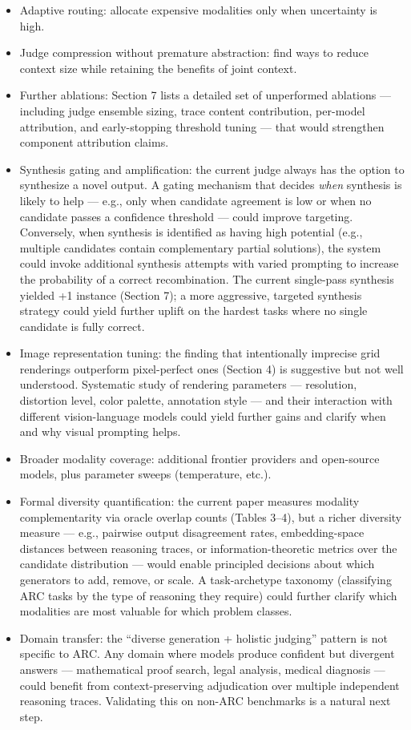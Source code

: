 \documentclass[11pt]{article}
\providecommand{\tightlist}{%
  \setlength{\itemsep}{0pt}\setlength{\parskip}{0pt}}
\begin{document}
\begin{itemize}
\tightlist
\item
  Adaptive routing: allocate expensive modalities only when uncertainty
  is high.
\item
  Judge compression without premature abstraction: find ways to reduce
  context size while retaining the benefits of joint context.
\item
  Further ablations: Section 7 lists a detailed set of unperformed
  ablations --- including judge ensemble sizing, trace content
  contribution, per-model attribution, and early-stopping threshold
  tuning --- that would strengthen component attribution claims.
\item
  Synthesis gating and amplification: the current judge always has the
  option to synthesize a novel output. A gating mechanism that decides
  \emph{when} synthesis is likely to help --- e.g., only when candidate
  agreement is low or when no candidate passes a confidence threshold
  --- could improve targeting. Conversely, when synthesis is identified
  as having high potential (e.g., multiple candidates contain
  complementary partial solutions), the system could invoke additional
  synthesis attempts with varied prompting to increase the probability
  of a correct recombination. The current single-pass synthesis yielded
  +1 instance (Section 7); a more aggressive, targeted synthesis
  strategy could yield further uplift on the hardest tasks where no
  single candidate is fully correct.
\item
  Image representation tuning: the finding that intentionally imprecise
  grid renderings outperform pixel-perfect ones (Section 4) is
  suggestive but not well understood. Systematic study of rendering
  parameters --- resolution, distortion level, color palette, annotation
  style --- and their interaction with different vision-language models
  could yield further gains and clarify when and why visual prompting
  helps.
\item
  Broader modality coverage: additional frontier providers and
  open-source models, plus parameter sweeps (temperature, etc.).
\item
  Formal diversity quantification: the current paper measures modality
  complementarity via oracle overlap counts (Tables 3--4), but a richer
  diversity measure --- e.g., pairwise output disagreement rates,
  embedding-space distances between reasoning traces, or
  information-theoretic metrics over the candidate distribution ---
  would enable principled decisions about which generators to add,
  remove, or scale. A task-archetype taxonomy (classifying ARC tasks by
  the type of reasoning they require) could further clarify which
  modalities are most valuable for which problem classes.
\item
  Domain transfer: the ``diverse generation + holistic judging'' pattern
  is not specific to ARC. Any domain where models produce confident but
  divergent answers --- mathematical proof search, legal analysis,
  medical diagnosis --- could benefit from context-preserving
  adjudication over multiple independent reasoning traces. Validating
  this on non-ARC benchmarks is a natural next step.
\end{itemize}
\end{document}
